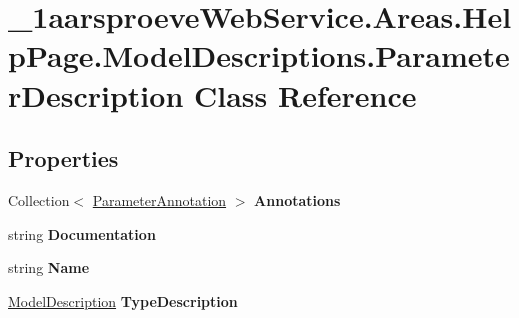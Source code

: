 \hypertarget{class__1aarsproeve_web_service_1_1_areas_1_1_help_page_1_1_model_descriptions_1_1_parameter_description}{}\section{\+\_\+1aarsproeve\+Web\+Service.\+Areas.\+Help\+Page.\+Model\+Descriptions.\+Parameter\+Description Class Reference}
\label{class__1aarsproeve_web_service_1_1_areas_1_1_help_page_1_1_model_descriptions_1_1_parameter_description}
\subsection*{Properties}
\begin{DoxyCompactItemize}
\item 
\hypertarget{class__1aarsproeve_web_service_1_1_areas_1_1_help_page_1_1_model_descriptions_1_1_parameter_description_a1b6f58c986d3889be141252c4ec520fc}{}Collection$<$ \hyperlink{class__1aarsproeve_web_service_1_1_areas_1_1_help_page_1_1_model_descriptions_1_1_parameter_annotation}{Parameter\+Annotation} $>$ {\bfseries Annotations}\label{class__1aarsproeve_web_service_1_1_areas_1_1_help_page_1_1_model_descriptions_1_1_parameter_description_a1b6f58c986d3889be141252c4ec520fc}

\item 
\hypertarget{class__1aarsproeve_web_service_1_1_areas_1_1_help_page_1_1_model_descriptions_1_1_parameter_description_af387fc5f4d80c5592ef1635ed4232d3c}{}string {\bfseries Documentation}\label{class__1aarsproeve_web_service_1_1_areas_1_1_help_page_1_1_model_descriptions_1_1_parameter_description_af387fc5f4d80c5592ef1635ed4232d3c}

\item 
\hypertarget{class__1aarsproeve_web_service_1_1_areas_1_1_help_page_1_1_model_descriptions_1_1_parameter_description_aa0ef3eefaa65192807631838a31f9b5d}{}string {\bfseries Name}\label{class__1aarsproeve_web_service_1_1_areas_1_1_help_page_1_1_model_descriptions_1_1_parameter_description_aa0ef3eefaa65192807631838a31f9b5d}

\item 
\hypertarget{class__1aarsproeve_web_service_1_1_areas_1_1_help_page_1_1_model_descriptions_1_1_parameter_description_a0348d902ef3d41b4555e31c9a0421b6a}{}\hyperlink{class__1aarsproeve_web_service_1_1_areas_1_1_help_page_1_1_model_descriptions_1_1_model_description}{Model\+Description} {\bfseries Type\+Description}\label{class__1aarsproeve_web_service_1_1_areas_1_1_help_page_1_1_model_descriptions_1_1_parameter_description_a0348d902ef3d41b4555e31c9a0421b6a}

\end{DoxyCompactItemize}


